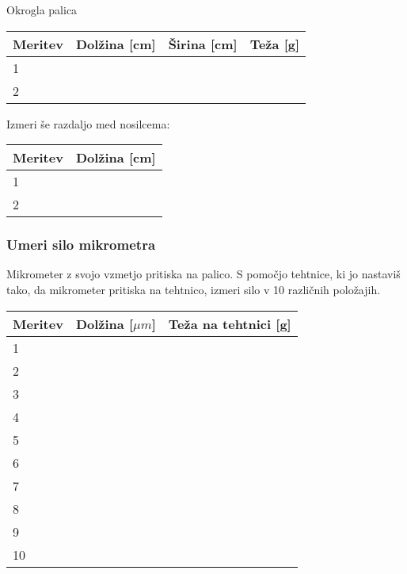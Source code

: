 \documentclass[11pt, a4paper]{article}
\begin{document}
Okrogla palica
\begin{center}
\begin{tabular}{|l|l|l|l|}
\hline
Meritev & Dolžina {[}cm{]} & Širina {[}cm{]} & Teža {[}g{]} \\ \hline
1       &                  &                 &              \\ \hline
2       &                  &                 &              \\ \hline
\end{tabular}
\end{center}

Izmeri še razdaljo med nosilcema:
\begin{center}
\begin{tabular}{|l|l|}
\hline
Meritev & Dolžina {[}cm{]} \\ \hline
1       &                  \\ \hline
2       &                  \\ \hline
\end{tabular}
\end{center}

\subsubsection{Umeri silo mikrometra}
Mikrometer z svojo vzmetjo pritiska na palico. S pomočjo tehtnice, ki jo nastaviš tako, da mikrometer pritiska na tehtnico, izmeri silo v 10 različnih položajih.

\begin{center}
    \begin{tabular}{|l|l|l|}
\hline
Meritev & Dolžina [$ \mu m $] & Teža na tehtnici {[}g{]} \\ \hline
1       &                  &                          \\ \hline
2       &                  &                          \\ \hline
3       &                  &                          \\ \hline
4       &                  &                          \\ \hline
5       &                  &                          \\ \hline
6       &                  &                          \\ \hline
7       &                  &                          \\ \hline
8       &                  &                          \\ \hline
9       &                  &                          \\ \hline
10      &                  &                          \\ \hline
\end{tabular}
\end{center}
\end{document}
